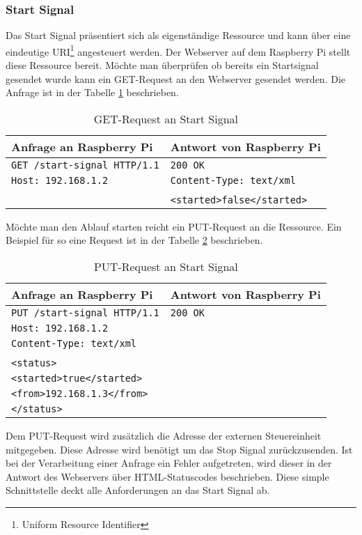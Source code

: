 \subsubsection{Start Signal}
Das Start Signal präsentiert sich als eigenständige Ressource und kann über eine eindeutige URI\footnote{Uniform Resource Identifier} angesteuert werden. Der Webserver auf dem Raspberry Pi stellt diese Ressource bereit. Möchte man überprüfen ob bereits ein Startsignal gesendet wurde kann ein GET-Request an den Webserver gesendet werden. Die Anfrage ist in der Tabelle \ref{tab:get-start-signal} beschrieben.

\begin{table}[h!]
	\centering
	\begin{tabular}{|l|l|}
		\hline Anfrage an Raspberry Pi 			 & Antwort von Raspberry Pi 	  \\ 
		\hline \verb|GET /start-signal HTTP/1.1| & \verb|200 OK| 				  \\
			   \verb|Host: 192.168.1.2| 		 & \verb|Content-Type: text/xml|  \\
			   									 &  							  \\
			   									 & \verb|<started>false</started>| \\ 
		\hline 
	\end{tabular} 
	\caption{GET-Request an Start Signal}
	\label{tab:get-start-signal}
\end{table}

Möchte man den Ablauf starten reicht ein PUT-Request an die Ressource. Ein Beispiel für so eine Request ist in der Tabelle \ref{tab:put-start-signal} beschrieben.

\begin{table}[h!]
	\centering
	\begin{tabular}{|l|l|}
		\hline Anfrage an Raspberry Pi 			 & Antwort von Raspberry Pi \\ 
		\hline \verb|PUT /start-signal HTTP/1.1| & \verb|200 OK| 			\\
			   \verb|Host: 192.168.1.2| 		 & 							\\
			   \verb|Content-Type: text/xml|	 &  						\\
			   									 &  						\\
			   \verb|<status>|	 				 &  						\\
			   \verb|<started>true</started>|	 &  						\\
			   \verb|<from>192.168.1.3</from>|	 &  						\\
			   \verb|</status>|	 				 &  						\\ 
		\hline 
	\end{tabular} 
	\caption{PUT-Request an Start Signal}
	\label{tab:put-start-signal}
\end{table}

Dem PUT-Request wird zusätzlich die Adresse der externen Steuereinheit mitgegeben. Diese Adresse wird benötigt um das Stop Signal zurückzusenden. Ist bei der Verarbeitung einer Anfrage ein Fehler aufgetreten, wird dieser in der Antwort des Webservers über HTML-Statuscodes beschrieben. Diese simple Schnittstelle deckt alle Anforderungen an das Start Signal ab.